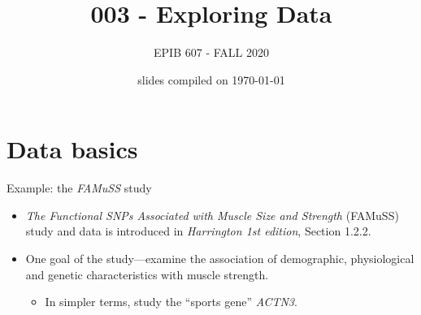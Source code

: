 \documentclass[10pt]{beamer}\usepackage[]{graphicx}\usepackage[]{color}
\begin{document}
	
	
	
	
	\title{003 - Exploring Data}
	\author{EPIB 607 - FALL 2020}
	
	\date{slides compiled on \today}
	
	\maketitle

\section{Data basics}

\begin{frame}{Example: the \emph{FAMuSS} study}
	\protect\hypertarget{example-the-famuss-study}{}
	
\begin{itemize}
	\item 	\emph{The Functional SNPs Associated with Muscle Size and Strength}
	(FAMuSS) study and data is introduced in \emph{Harrington 1st edition}, Section
	1.2.2.

			
	\item One goal of the study---examine the association of demographic,
	physiological and genetic characteristics with muscle strength.
	
	\begin{itemize}
		\tightlist
		\item
		In simpler terms, study the ``sports gene'' \emph{ACTN3}.
	\end{itemize}
	
	
\end{itemize}
	
	
	
\end{frame}
\end{document}
